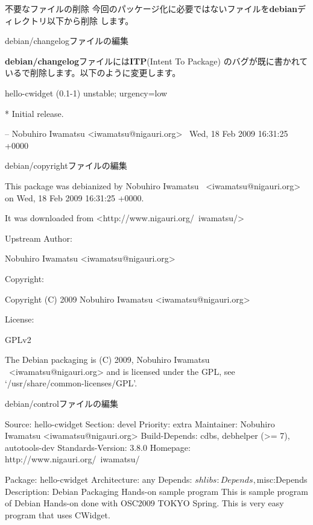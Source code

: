 \begin{frame}[containsverbatim]{不要なファイルの削除}
今回のパッケージ化に必要ではないファイルを{\bf debian}ディレクトリ以下から削除
します。
\end{frame}

\begin{frame}[containsverbatim]{debian/changelogファイルの編集}

{\bf debian/changelog}ファイルには{\bf ITP}(Intent To Package)
のバグが既に書かれているで削除します。以下のように変更します。
\begin{commandline}
hello-cwidget (0.1-1) unstable; urgency=low

  * Initial release.

 -- Nobuhiro Iwamatsu <iwamatsu@nigauri.org> \
                  Wed, 18 Feb 2009 16:31:25 +0000

\end{commandline}
\end{frame}

\begin{frame}[containsverbatim]{debian/copyrightファイルの編集}
\begin{commandline}
This package was debianized by Nobuhiro Iwamatsu \ 
                                <iwamatsu@nigauri.org> on
Wed, 18 Feb 2009 16:31:25 +0000.

It was downloaded from <http://www.nigauri.org/~iwamatsu/>

Upstream Author:

    Nobuhiro Iwamatsu <iwamatsu@nigauri.org>

Copyright:

    Copyright (C) 2009 Nobuhiro Iwamatsu <iwamatsu@nigauri.org>

License:

    GPLv2

The Debian packaging is (C) 2009, Nobuhiro Iwamatsu \ 
        <iwamatsu@nigauri.org> and
is licensed under the GPL, see `/usr/share/common-licenses/GPL'.
\end{commandline}
\end{frame}

\begin{frame}[containsverbatim]{debian/controlファイルの編集}
\begin{commandline}
Source: hello-cwidget
Section: devel
Priority: extra
Maintainer: Nobuhiro Iwamatsu <iwamatsu@nigauri.org>
Build-Depends: cdbs, debhelper (>= 7), autotools-dev
Standards-Version: 3.8.0
Homepage: http://www.nigauri.org/~iwamatsu/

Package: hello-cwidget
Architecture: any
Depends: ${shlibs:Depends}, ${misc:Depends}
Description: Debian Packaging Hands-on sample program
 This is sample program of Debian Hands-on done with
 OSC2009 TOKYO Spring.
 This is very easy program that uses CWidget.
\end{commandline}
\end{frame}


